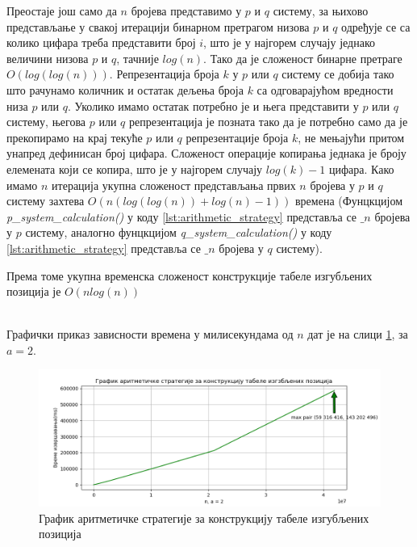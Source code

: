 \documentclass[a4paper]{article}
\begin{document}
Преостаје још само да $ n $ бројева представимо у $ p $ и $ q $ систему, за њихово представљање у свакој итерацији бинарном претрагом низова $ p $ и $ q $ одређује се са колико цифара треба представити број $ i $, што је у најгорем случају једнако величини низова $ p $ и $ q $, тачније $ log(n) $. Тако да је сложеност бинарне претраге $ O(log(log(n))) $. Репрезентација броја $ k $ у $ p $ или $ q $ систему се добија тако што рачунамо количник и остатак дељења броја $ k $ са одговарајућом вредности низа $ p $ или $ q $. Уколико имамо остатак потребно је и њега представити у $ p $ или $ q $ систему, његова $ p $ или $ q $ репрезентација је позната тако да је потребно само да је прекопирамо на крај текуће $ p $ или $ q $ репрезентације броја $ k $, не мењајући притом унапред дефинисан број цифара. Сложеност операције копирања једнака је броју елемената који се копира, што је у најгорем случају $ log(k) - 1 $ цифара. Како имамо $ n $ итерација укупна сложеност представљања првих $ n $ бројева у $ p $ и $ q $ систему захтева $ O(n(log(log(n)) + log(n) - 1)) $ времена (Фунцкцијом \textit{p\_system\_calculation()} у коду \ref{lst:arithmetic_strategy} представља се $ \_n $ бројева у $ p $ систему, аналогно фунцкцијом \textit{q\_system\_calculation()} у коду \ref{lst:arithmetic_strategy} представља се $ \_n $ бројева у $ q $ систему).

Према томе укупна временска сложеност конструкције табеле изгубљених позиција је $ O(nlog(n)) $



\leavevmode\\
Графички приказ зависности времена у милисекундама од $ n $ дат је на слици \ref{fig:arithmetic}, за $ a = 2 $.

\begin{figure}[H]
	\begin{center}
		\includegraphics[width=\textwidth]{arithmetic.png}
	\end{center}
	\caption{График аритметичке стратегије за конструкцију табеле изгубљених позиција}
	\label{fig:arithmetic}
\end{figure}
\end{document}
